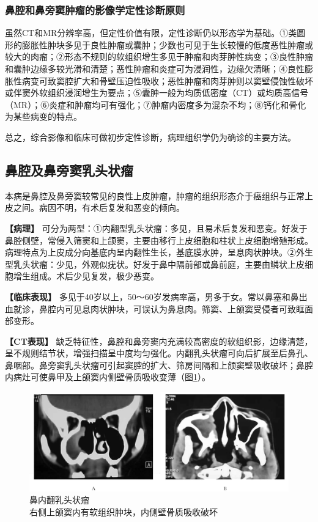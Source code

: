 \subsubsection{鼻腔和鼻旁窦肿瘤的影像学定性诊断原则}

虽然CT和MR分辨率高，但定性价值有限，定性诊断仍以形态学为基础。①类圆形的膨胀性肿块多见于良性肿瘤或囊肿；少数也可见于生长较慢的低度恶性肿瘤或较大的肉瘤；②形态不规则的软组织增生多见于肿瘤和肉芽肿性病变；③良性肿瘤和囊肿边缘多较光滑和清楚；恶性肿瘤和炎症可为浸润性，边缘欠清晰；④良性膨胀性病变可致窦腔扩大和骨壁压迫性吸收；恶性肿瘤和肉芽肿则以窦壁侵蚀性破坏或伴窦外软组织浸润增生为要点；⑤囊肿一般为均质低密度（CT）或均质高信号（MR）；⑥炎症和肿瘤均可有强化；⑦肿瘤内密度多为混杂不均；⑧钙化和骨化为某些病变的特点。

总之，综合影像和临床可做初步定性诊断，病理组织学仍为确诊的主要方法。

\subsection{鼻腔及鼻旁窦乳头状瘤}

本病是鼻腔及鼻旁窦较常见的良性上皮肿瘤，肿瘤的组织形态介于癌组织与正常上皮之间。病因不明，有术后复发和恶变的倾向。

\textbf{【病理】}
可分为两型：①内翻型乳头状瘤：多见，且易术后复发和恶变。好发于鼻腔侧壁，常侵入筛窦和上颌窦，主要由移行上皮细胞和柱状上皮细胞增殖形成。病理特点为上皮成分向基底内呈内翻性生长，基底膜水肿，呈息肉状肿块。②外生型乳头状瘤：少见，外观似疣状。好发于鼻中隔前部或鼻前庭，主要由鳞状上皮细胞增生组成。术后少见复发，极少恶变。

\textbf{【临床表现】}
多见于40岁以上，50～60岁发病率高，男多于女。常以鼻塞和鼻出血就诊，鼻腔内可见息肉状肿块，可误认为鼻息肉。筛窦、上颌窦受侵者可致眶面部变形。

\textbf{【CT表现】}
缺乏特征性，鼻腔和鼻旁窦内充满较高密度的软组织影，边缘清楚，呈不规则结节状，增强扫描呈中度均匀强化。内翻乳头状瘤可向后扩展至后鼻孔、鼻咽部。鼻旁窦乳头状瘤可引起窦腔的扩大、筛房间隔和上颌窦壁吸收破坏；鼻腔内病灶可使鼻甲及上颌窦内侧壁骨质吸收变薄（图\ref{fig5-9}）。

\begin{figure}[!htbp]
 \centering
 \includegraphics[width=.7\textwidth,height=\textheight,keepaspectratio]{./images/Image00131.jpg}
 \captionsetup{justification=centering}
 \caption{鼻内翻乳头状瘤\\{\small 右侧上颌窦内有软组织肿块，内侧壁骨质吸收破坏}}
 \label{fig5-9}
  \end{figure} 

